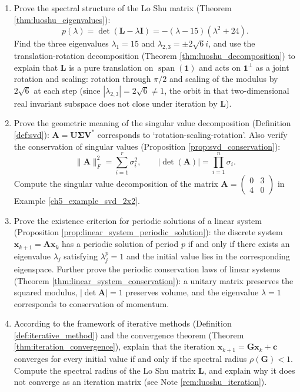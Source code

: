 \begin{enumerate}[leftmargin=3em, label=\textbf{Exercise \arabic*}]
    \item Prove the spectral structure of the Lo Shu matrix (Theorem \ref{thm:luoshu_eigenvalues}):
    \[
    p(\lambda)=\det(\mathbf{L}-\lambda\mathbf{I})
    =-(\lambda-15)(\lambda^2+24).
    \]
    Find the three eigenvalues $\lambda_1=15$ and $\lambda_{2,3}=\pm2\sqrt{6}i$,
    and use the translation-rotation decomposition (Theorem \ref{thm:luoshu_decomposition})
    to explain that $\mathbf{L}$ is a pure translation on $\operatorname{span}(\mathbf{1})$
    and acts on $\mathbf{1}^\perp$ as a joint rotation and scaling: rotation through $\pi/2$ and scaling of the modulus by $2\sqrt{6}$ at each step (since $|\lambda_{2,3}|=2\sqrt{6}\ne1$, the orbit in that two-dimensional real invariant subspace does not close under iteration by $\mathbf{L}$).

    \item Prove the geometric meaning of the singular value decomposition (Definition \ref{def:svd}):
    $\mathbf{A}=\mathbf{U}\boldsymbol{\Sigma}\mathbf{V}^*$ corresponds to `rotation-scaling-rotation'.
    Also verify the conservation of singular values (Proposition \ref{prop:svd_conservation}):
    \[
    \|\mathbf{A}\|_F^2=\sum_{i=1}^{r}\sigma_i^2,\qquad
    |\det(\mathbf{A})|=\prod_{i=1}^{n}\sigma_i.
    \]
    Compute the singular value decomposition of the matrix
    $\mathbf{A}=\begin{pmatrix}0&3\\4&0\end{pmatrix}$ in Example \ref{ch5_example_svd_2x2}.

    \item Prove the existence criterion for periodic solutions of a linear system (Proposition \ref{prop:linear_system_periodic_solution}):
    the discrete system $\mathbf{x}_{k+1}=\mathbf{A}\mathbf{x}_k$ has a periodic solution of period $p$
    if and only if there exists an eigenvalue $\lambda_j$ satisfying $\lambda_j^p=1$
    and the initial value lies in the corresponding eigenspace.
    Further prove the periodic conservation laws of linear systems (Theorem \ref{thm:linear_system_conservation}):
    a unitary matrix preserves the squared modulus, $|\det\mathbf{A}|=1$ preserves volume,
    and the eigenvalue $\lambda=1$ corresponds to conservation of momentum.

    \item According to the framework of iterative methods (Definition \ref{def:iterative_method}) and the convergence theorem (Theorem \ref{thm:iteration_convergence}),
    explain that the iteration $\mathbf{x}_{k+1}=\mathbf{G}\mathbf{x}_k+\mathbf{c}$ converges for every initial value
    if and only if the spectral radius $\rho(\mathbf{G})<1$.
    Compute the spectral radius of the Lo Shu matrix $\mathbf{L}$, and explain why it does not converge as an iteration matrix
    (see Note \ref{rem:luoshu_iteration}).


\end{enumerate}
